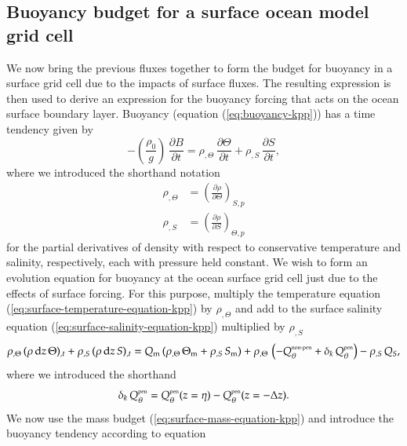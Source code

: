 \subsection{Buoyancy budget for a surface ocean model grid cell}

We now bring the previous fluxes together to form the budget for
buoyancy in a surface grid cell due to the impacts of surface fluxes.
The resulting expression is then used to derive an expression for the
buoyancy forcing that acts on the ocean surface boundary layer.
Buoyancy (equation (\ref{eq:buoyancy-kpp})) has a time tendency given
by
\begin{equation}
 -\left( \frac{\rho_{0}}{g} \right) \,  \frac{\partial B}{\partial t} 
  =  \rho_{,\Theta} \, \frac{\partial \Theta}{\partial t}  + \rho_{,S} \, \frac{\partial S}{\partial t},
\label{eq:buoyancy-time-tendency-kpp}
\end{equation}
 where we introduced the shorthand notation 
\begin{align}
\rho_{,\Theta} &=
 \left( \frac{\partial \rho}{\partial \Theta} \right)_{S,p} 
\\
\rho_{,S} &=
 \left( \frac{\partial \rho}{\partial S} \right)_{\Theta,p} 
\end{align}
for the partial derivatives of density with respect to conservative
temperature and salinity, respectively, each with pressure held
constant.  We wish to form an evolution equation for buoyancy at the
ocean surface grid cell just due to the effects of surface forcing.
For this purpose, multiply the temperature equation
(\ref{eq:surface-temperature-equation-kpp}) by $\rho_{,\Theta}$ and
add to the surface salinity equation
(\ref{eq:surface-salinity-equation-kpp}) multiplied by $\rho_{,S}$
\begin{equation}
  \rho_{,\Theta} \, (\rho \, \mathrm{d}z \, \Theta)_{,t}
  +
  \rho_{,S}      \, (\rho \, \mathrm{d}z \, S)_{,t}
  =
  Q_{\mbox{\scriptsize m}} \, (\rho_{,\Theta} \, \Theta_{\mbox{\scriptsize m}} +  \rho_{,S}  \, S_{\mbox{\scriptsize m}}) 
  + \rho_{,\Theta} \, \left( 
     -Q_{\theta}^{\mbox{\tiny non-pen}} + 
    \delta_{k} \, Q_{\theta}^{\mbox{\tiny pen}} \right)
  -  \rho_{,S} \, Q_{S},
\end{equation}
 where we introduced the shorthand 
\begin{equation}
 \delta_{k} \, Q_{\theta}^{\mbox{\tiny pen}} = 
   Q_{\theta}^{\mbox{\tiny pen}}(z=\eta) - Q_{\theta}^{\mbox{\tiny pen}}(z=-\Delta z).
\label{eq:delta-k-defined}
\end{equation}
We now use the mass budget (\ref{eq:surface-mass-equation-kpp}) and
introduce the buoyancy tendency according to equation
